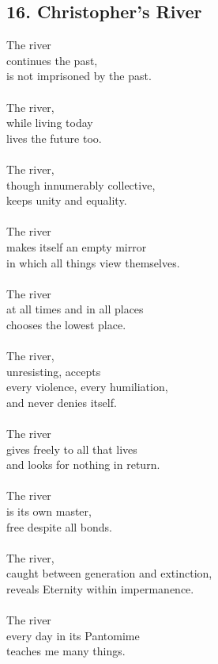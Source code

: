 \documentclass[12pt,letterpaper]{article}
\begin{document}
\begin{appendix}
\begin{subappendices}
        \subsection{16. Christopher's River}
        \begin{linenumbers*}
The river \\
continues the past, \\
is not imprisoned by the past. \\\\
The river, \\
while living today \\
lives the future too. \\\\
The river, \\
though innumerably collective, \\
keeps unity and equality. \\\\
The river \\
makes itself an empty mirror \\
in which all things view themselves. \\\\
The river \\
at all times and in all places \\
chooses the lowest place. \\\\
The river, \\
unresisting, accepts \\
every violence, every humiliation, \\
and never denies itself. \\\\
The river \\
gives freely to all that lives \\
and looks for nothing in return. \\\\
The river \\
is its own master, \\
free despite all bonds. \\\\
The river, \\
caught between generation and extinction, \\
reveals Eternity within impermanence. \\\\
The river \\
every day in its Pantomime \\
teaches me many things. \\
        \end{linenumbers*}
    \end{subappendices}

\end{appendix}
\end{document}
